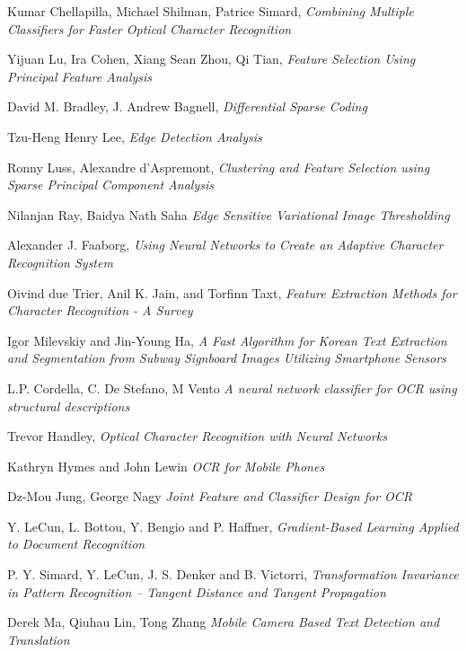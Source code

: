 \begin{thebibliography}{99}
  Kumar Chellapilla, Michael Shilman, Patrice Simard, 
  \textit{Combining Multiple Classifiers for Faster Optical Character Recognition}
  
  Yijuan Lu, Ira Cohen, Xiang Sean Zhou, Qi Tian, 
  \textit{Feature Selection Using Principal Feature Analysis}
  
  David M. Bradley, J. Andrew Bagnell, 
  \textit{Differential Sparse Coding}
  
  Tzu-Heng Henry Lee, 
  \textit{Edge Detection Analysis}

  Ronny Luss, Alexandre d'Aspremont, 
  \textit{Clustering and Feature Selection using Sparse Principal Component Analysis}

  Nilanjan Ray, Baidya Nath Saha
  \textit{Edge Sensitive Variational Image Thresholding}
  
  Alexander J. Faaborg, 
  \textit{Using Neural Networks to Create an Adaptive Character Recognition System}
  
  Oivind due Trier, Anil K. Jain, and Torfinn Taxt,
  \textit{Feature Extraction Methods for Character Recognition - A Survey}
  
  Igor Milevskiy and Jin-Young Ha, 
  \textit{A Fast Algorithm for Korean Text Extraction and Segmentation from Subway Signboard Images Utilizing Smartphone Sensors}
  
  L.P. Cordella, C. De Stefano, M Vento
  \textit{A neural network classifier for OCR using structural descriptions}
  
  Trevor Handley, 
  \textit{Optical Character Recognition with Neural Networks}
  
  Kathryn Hymes and John Lewin
  \textit{OCR for Mobile Phones}
  
  Dz-Mou Jung, George Nagy
  \textit{Joint Feature and Classifier Design for OCR}
  
  Y. LeCun, L. Bottou, Y. Bengio and P. Haffner, 
  \textit{Gradient-Based Learning Applied to Document Recognition}  
  
  P. Y. Simard, Y. LeCun, J. S. Denker and B. Victorri, 
  \textit{Transformation Invariance in Pattern Recognition -- Tangent Distance and Tangent Propagation} 
  
  Derek Ma, Qiuhau Lin, Tong Zhang
  \textit{Mobile Camera Based Text Detection and Translation}  
  

\end{thebibliography}
